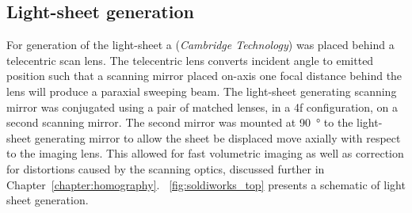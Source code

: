 \subsection{Light-sheet generation}

For generation of the \gls{light-sheet} a  (\emph{Cambridge Technology}) was placed behind a \gls{telecentric} scan lens.
The \gls{telecentric} lens converts incident angle to emitted position such that a scanning mirror placed on-axis one focal distance behind the lens will produce a paraxial sweeping beam.
The \gls{light-sheet} generating scanning mirror was conjugated using a pair of matched lenses, in a \gls{4f} configuration, on a second scanning mirror.
The second mirror was mounted at \SI{90}{\degree} to the light-sheet generating mirror to allow the sheet be displaced move axially with respect to the imaging lens.
This allowed for fast volumetric imaging as well as correction for distortions caused by the scanning optics, discussed further in Chapter~\ref{chapter:homography}.
\figurename~\ref{fig:soldiworks_top} presents a schematic of light sheet generation.


